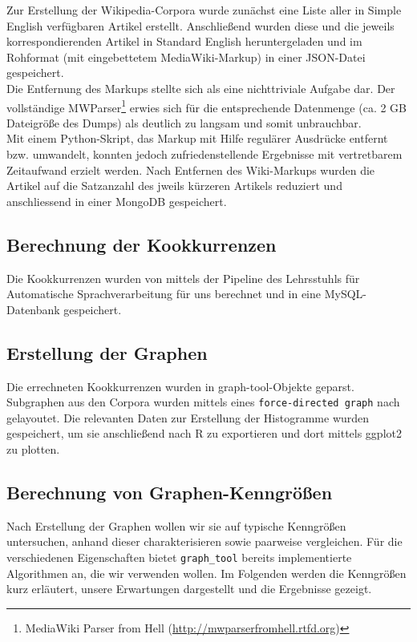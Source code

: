 \documentclass[12pt, a4paper]{article}
\begin{document}
Zur Erstellung der Wikipedia-Corpora wurde zunächst eine Liste aller
in Simple English verfügbaren Artikel erstellt. Anschließend wurden diese und
die jeweils korrespondierenden Artikel in Standard English heruntergeladen und
im Rohformat (mit eingebettetem MediaWiki-Markup) in einer JSON-Datei gespeichert.
\\
Die Entfernung des Markups stellte sich als eine nichttriviale Aufgabe dar.
Der vollständige MWParser\footnote{MediaWiki
Parser from Hell (\url{http://mwparserfromhell.rtfd.org})} erwies sich für die
entsprechende Datenmenge (ca. 2 GB Dateigröße des Dumps) als deutlich zu langsam
und somit unbrauchbar.
\\
Mit einem Python-Skript, das Markup mit Hilfe regul\"arer Ausdr\"ucke entfernt
bzw. umwandelt, konnten jedoch zufriedenstellende Ergebnisse mit vertretbarem
Zeitaufwand erzielt werden.
Nach Entfernen des Wiki-Markups wurden die Artikel auf die Satzanzahl
des jweils k\"urzeren Artikels reduziert und anschliessend in einer MongoDB
gespeichert.

\subsection{Berechnung der Kookkurrenzen}

Die Kookkurrenzen wurden von mittels der Pipeline des Lehrsstuhls f\"ur
Automatische Sprachverarbeitung für uns berechnet und in eine MySQL-Datenbank
gespeichert.

\subsection{Erstellung der Graphen}

Die errechneten Kookkurrenzen wurden in graph-tool-Objekte geparst. Subgraphen
aus den Corpora wurden mittels eines \texttt{force-directed graph} nach
\cite{Hu2005} gelayoutet.
Die relevanten Daten zur Erstellung der Histogramme wurden gespeichert,
um sie anschließend nach R zu exportieren und dort mittels ggplot2 zu plotten.

\subsection{Berechnung von Graphen-Kenngr\"o\ss{}en}

Nach Erstellung der Graphen wollen wir sie auf typische Kenngrößen untersuchen,
anhand dieser charakterisieren sowie paarweise vergleichen. Für die
verschiedenen Eigenschaften bietet \texttt{graph\_tool} bereits implementierte
Algorithmen an, die wir verwenden wollen. Im Folgenden werden die Kenngrößen
kurz erläutert, unsere Erwartungen dargestellt und die Ergebnisse gezeigt.
\end{document}
